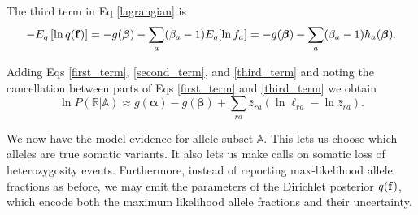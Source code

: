 \documentclass[nofootinbib,amssymb,amsmath]{revtex4}
\newcommand{\vf}{{\bf f}}
\newcommand{\valpha}{{\bm{\alpha}}}
\newcommand{\vbeta}{{\bm{\beta}}}
\begin{document}
The third term in Eq \ref{lagrangian} is
\begin{align}
- E_q \left[ \ln q(\vf) \right] = -g(\vbeta) - \sum_a (\beta_a - 1) E_q [\ln f_a] = -g(\vbeta) - \sum_a (\beta_a - 1) h_a(\vbeta) \label{third_term}.
\end{align}

Adding Eqs \ref{first_term}, \ref{second_term}, and \ref{third_term} and noting the cancellation between parts of Eqs \ref{first_term} and \ref{third_term} we obtain
\begin{equation}
\ln P(\mathbb{R} | \mathbb{A}) \approx g(\valpha) - g(\vbeta) +  \sum_{ra} \bar{z}_{ra} \left( \ln \ell_{ra} - \ln \bar{z}_{ra} \right).
\end{equation}

We now have the model evidence for allele subset $\mathbb{A}$.  This lets us choose which alleles are true somatic variants.  It also lets us make calls on somatic loss of heterozygosity events.  Furthermore, instead of reporting max-likelihood allele fractions as before, we may emit the parameters of the Dirichlet posterior $q(\vf)$, which encode both the maximum likelihood allele fractions and their uncertainty.
\end{document}
